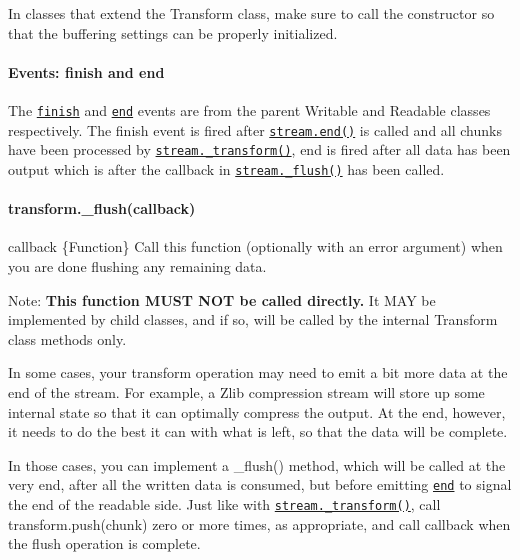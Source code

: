 In classes that extend the Transform class, make sure to call the constructor so that the buffering settings can be properly initialized.

\paragraph*{Events\+: \textquotesingle{}finish\textquotesingle{} and \textquotesingle{}end\textquotesingle{}}

The \href{#stream_event_finish}{\tt {\ttfamily \textquotesingle{}finish\textquotesingle{}}} and \href{#stream_event_end}{\tt {\ttfamily \textquotesingle{}end\textquotesingle{}}} events are from the parent Writable and Readable classes respectively. The {\ttfamily \textquotesingle{}finish\textquotesingle{}} event is fired after \href{#stream_writable_end_chunk_encoding_callback}{\tt {\ttfamily stream.\+end()}} is called and all chunks have been processed by \href{#stream_transform_transform_chunk_encoding_callback}{\tt {\ttfamily stream.\+\_\+transform()}}, {\ttfamily \textquotesingle{}end\textquotesingle{}} is fired after all data has been output which is after the callback in \href{#stream_transform_flush_callback}{\tt {\ttfamily stream.\+\_\+flush()}} has been called.

\paragraph*{transform.\+\_\+flush(callback)}


\begin{DoxyItemize}
\item {\ttfamily callback} \{Function\} Call this function (optionally with an error argument) when you are done flushing any remaining data.
\end{DoxyItemize}

Note\+: {\bfseries This function M\+U\+ST N\+OT be called directly.} It M\+AY be implemented by child classes, and if so, will be called by the internal Transform class methods only.

In some cases, your transform operation may need to emit a bit more data at the end of the stream. For example, a {\ttfamily Zlib} compression stream will store up some internal state so that it can optimally compress the output. At the end, however, it needs to do the best it can with what is left, so that the data will be complete.

In those cases, you can implement a {\ttfamily \+\_\+flush()} method, which will be called at the very end, after all the written data is consumed, but before emitting \href{#stream_event_end}{\tt {\ttfamily \textquotesingle{}end\textquotesingle{}}} to signal the end of the readable side. Just like with \href{#stream_transform_transform_chunk_encoding_callback}{\tt {\ttfamily stream.\+\_\+transform()}}, call {\ttfamily transform.\+push(chunk)} zero or more times, as appropriate, and call {\ttfamily callback} when the flush operation is complete.

